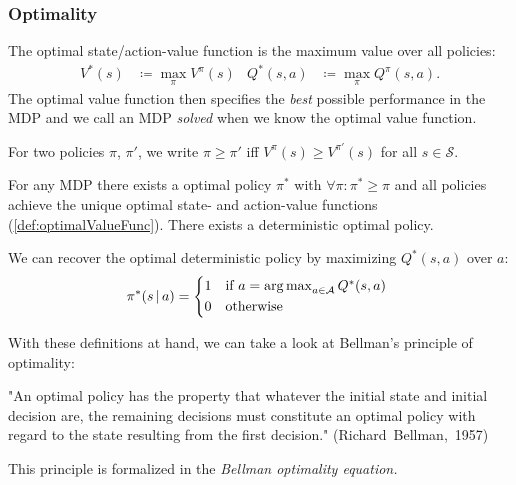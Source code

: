 			\subsubsection{Optimality}
				\begin{definition}[Optimality]  \label{def:optimalValueFunc}
					The optimal state/action-value function is the maximum value over all policies:
					\begin{align}
						V^\ast(s) &\coloneqq \max_\pi V^\pi(s) &
						Q^\ast(s, a) &\coloneqq \max_\pi Q^\pi(s, a).
					\end{align}
					The optimal value function then specifies the \emph{best} possible performance in the \ac{MDP} and we call an \ac{MDP} \emph{solved} when we know the optimal value function.
				\end{definition}
				\begin{definition}
					For two policies \(\pi\), \(\pi'\), we write \( \pi \geq \pi' \) iff \( V^\pi(s) \geq V^{\pi'}(s) \) for all \( s \in \mathcal{S} \).
				\end{definition}
				\begin{theorem}
					For any \acl{MDP} there exists a optimal policy \(\pi^\ast\) with \( \forall \pi : \pi^\ast \geq \pi \) and all policies achieve the unique optimal state- and action-value functions (\autoref{def:optimalValueFunc}). There exists a deterministic optimal policy.
				\end{theorem}
				\begin{remark}
					We can recover the optimal deterministic policy by maximizing \(Q^\ast(s, a)\) over \(a\):
					\begin{equation}
						\pi^\ast(s \given a) =
							\begin{cases*}
								1 & if \( a = \argmax_{a \in \mathcal{A}} Q^\ast(s, a) \) \\
								0 & otherwise
							\end{cases*}
					\end{equation}
				\end{remark}

				With these definitions at hand, we can take a look at Bellman's principle of optimality:
				\begin{center}
					"An optimal policy has the property that whatever the initial state and initial decision are, the remaining decisions must constitute an optimal policy with regard to the state resulting from the first decision." (Richard~Bellman,~1957)
				\end{center}
				This principle is formalized in the \emph{Bellman optimality equation.}

